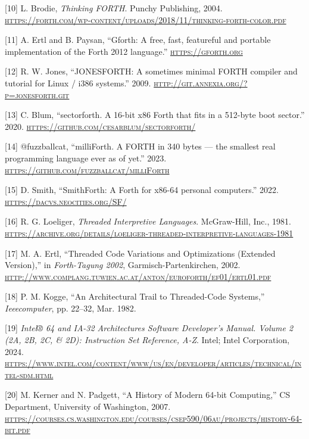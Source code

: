 \documentclass[a4paper,12pt,final]{article}
\begin{document}
\hypertarget{citeproc_bib_item_10}{[10] L. Brodie, \textit{Thinking FORTH}. Punchy Publishing, 2004. \textsc{\url{https://forth.com/wp-content/uploads/2018/11/thinking-forth-color.pdf}}}

\hypertarget{citeproc_bib_item_11}{[11] A. Ertl and B. Paysan, “Gforth: A free, fast, featureful and portable implementation of the Forth 2012 language.” \textsc{\url{https://gforth.org}}}

\hypertarget{citeproc_bib_item_12}{[12] R. W. Jones, “JONESFORTH: A sometimes minimal FORTH compiler and tutorial for Linux / i386 systems.” 2009. \textsc{\url{http://git.annexia.org/?p=jonesforth.git}}}

\hypertarget{citeproc_bib_item_13}{[13] C. Blum, “sectorforth. A 16-bit x86 Forth that fits in a 512-byte boot sector.” 2020. \textsc{\url{https://github.com/cesarblum/sectorforth/}}}

\hypertarget{citeproc_bib_item_14}{[14] @fuzzballcat, “milliForth. A FORTH in 340 bytes — the smallest real programming language ever as of yet.” 2023. \textsc{\url{https://github.com/fuzzballcat/milliForth}}}

\hypertarget{citeproc_bib_item_15}{[15] D. Smith, “SmithForth: A Forth for x86-64 personal computers.” 2022. \textsc{\url{https://dacvs.neocities.org/SF/}}}

\hypertarget{citeproc_bib_item_16}{[16] R. G. Loeliger, \textit{Threaded Interpretive Languages}. McGraw-Hill, Inc., 1981. \textsc{\url{https://archive.org/details/loeliger-threaded-interpretive-languages-1981}}}

\hypertarget{citeproc_bib_item_17}{[17] M. A. Ertl, “Threaded Code Variations and Optimizations (Extended Version),” in \textit{Forth-Tagung 2002}, Garmisch-Partenkirchen, 2002. \textsc{\url{http://www.complang.tuwien.ac.at/anton/euroforth/ef01/ertl01.pdf}}}

\hypertarget{citeproc_bib_item_18}{[18] P. M. Kogge, “An Architectural Trail to Threaded-Code Systems,” \textit{Ieeecomputer}, pp. 22–32, Mar. 1982.}

\hypertarget{citeproc_bib_item_19}{[19] \textit{Intel® 64 and IA-32 Architectures Software Developer’s Manual. Volume 2 (2A, 2B, 2C, \& 2D): Instruction Set Reference, A-Z}. Intel; Intel Corporation, 2024. \textsc{\url{https://www.intel.com/content/www/us/en/developer/articles/technical/intel-sdm.html}}}

\hypertarget{citeproc_bib_item_20}{[20] M. Kerner and N. Padgett, “A History of Modern 64-bit Computing,” CS Department, University of Washington, 2007. \textsc{\url{https://courses.cs.washington.edu/courses/csep590/06au/projects/history-64-bit.pdf}}}
\end{document}

